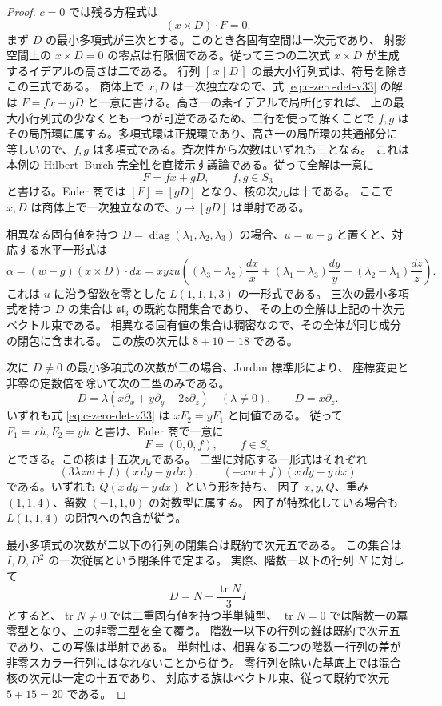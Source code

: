 \begin{proof}
$c=0$ では残る方程式は
\begin{equation}
 (x\times D)\cdot F=0.
 \label{eq:c-zero-det-v33}
\end{equation}
まず $D$ の最小多項式が三次とする。このとき各固有空間は一次元であり、
射影空間上の $x\times D=0$ の零点は有限個である。従って三つの二次式
$x\times D$ が生成するイデアルの高さは二である。
行列 $[\,x\mid D\,]$ の最大小行列式は、符号を除きこの三式である。
商体上で $x,D$ は一次独立なので、式 \eqref{eq:c-zero-det-v33} の解は
$F=fx+gD$ と一意に書ける。高さ一の素イデアルで局所化すれば、
上の最大小行列式の少なくとも一つが可逆であるため、二行を使って解くことで
$f,g$ はその局所環に属する。多項式環は正規環であり、高さ一の局所環の共通部分に
等しいので、$f,g$ は多項式である。斉次性から次数はいずれも三となる。
これは本例の Hilbert--Burch 完全性を直接示す議論である。従って全解は一意に
\[
 F=fx+gD,\qquad f,g\in S_3
\]
と書ける。Euler 商では $[F]=[gD]$ となり、核の次元は十である。
ここで $x,D$ は商体上で一次独立なので、$g\mapsto[gD]$ は単射である。

相異なる固有値を持つ $D=\operatorname{diag}(\lambda_1,\lambda_2,\lambda_3)$
の場合、$u=w-g$ と置くと、対応する水平一形式は
\[
 \alpha=(w-g)(x\times D)\cdot dx
 =xyzu\left((\lambda_3-\lambda_2)\frac{dx}{x}
 +(\lambda_1-\lambda_3)\frac{dy}{y}
 +(\lambda_2-\lambda_1)\frac{dz}{z}\right).
\]
これは $u$ に沿う留数を零とした $L(1,1,1,3)$ の一形式である。
三次の最小多項式を持つ $D$ の集合は $\mathfrak{sl}_3$ の既約な開集合であり、
その上の全解は上記の十次元ベクトル束である。
相異なる固有値の集合は稠密なので、その全体が同じ成分の閉包に含まれる。
この族の次元は $8+10=18$ である。

次に $D\ne0$ の最小多項式の次数が二の場合、Jordan 標準形により、
座標変更と非零の定数倍を除いて次の二型のみである。
\[
 D=\lambda(x\partial_x+y\partial_y-2z\partial_z)\quad(\lambda\ne0),
 \qquad D=x\partial_z.
\]
いずれも式 \eqref{eq:c-zero-det-v33} は $xF_2=yF_1$ と同値である。
従って $F_1=xh,F_2=yh$ と書け、Euler 商で一意に
\[
 F=(0,0,f),\qquad f\in S_4
\]
とできる。この核は十五次元である。
二型に対応する一形式はそれぞれ
\[
 (3\lambda zw+f)(x\,dy-y\,dx),\qquad
 (-xw+f)(x\,dy-y\,dx)
\]
である。いずれも $Q(x\,dy-y\,dx)$ という形を持ち、
因子 $x,y,Q$、重み $(1,1,4)$、留数 $(-1,1,0)$ の対数型に属する。
因子が特殊化している場合も $L(1,1,4)$ の閉包への包含が従う。

最小多項式の次数が二以下の行列の閉集合は既約で次元五である。
この集合は $I,D,D^2$ の一次従属という閉条件で定まる。
実際、階数一以下の行列 $N$ に対して
\[
 D=N-\frac{\operatorname{tr}N}{3}I
\]
とすると、$\operatorname{tr}N\ne0$ では二重固有値を持つ半単純型、
$\operatorname{tr}N=0$ では階数一の冪零型となり、上の非零二型を全て覆う。
階数一以下の行列の錐は既約で次元五であり、この写像は単射である。
単射性は、相異なる二つの階数一行列の差が非零スカラー行列にはなれないことから従う。
零行列を除いた基底上では混合核の次元は一定の十五であり、
対応する族はベクトル束、従って既約で次元 $5+15=20$ である。


\end{proof}

